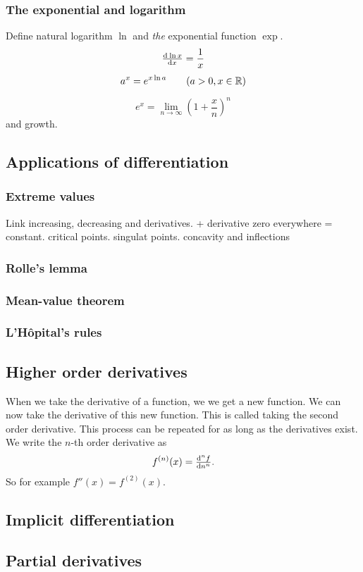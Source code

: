 \subsubsection{The exponential and logarithm}
Define natural logarithm $\ln$ and \textit{the} exponential function $\exp$.
\[ \od{\ln x}{x} = \frac{1}{x} \]
\[ a^x = e^{x\ln a} \qquad (a>0, x\in \mathbb{R}) \]

\[ e^x = \lim_{n\to \infty}\left(1+\frac{x}{n}\right)^n \]
and growth.

\subsection{Applications of differentiation}
\subsubsection{Extreme values}
Link increasing, decreasing and derivatives. + derivative zero everywhere = constant.
critical points. singulat points. concavity and inflections
\subsubsection{Rolle's lemma}
\subsubsection{Mean-value theorem}
\subsubsection{L'Hôpital's rules}


\subsection{Higher order derivatives}
When we take the derivative of a function, we we get a new function. We can now take the derivative of this new function. This is called taking the second order derivative. This process can be repeated for as long as the derivatives exist. We write the $n$-th order derivative as
\[ f^{(n)}(x) = \od[n]{f}{n}. \]
So for example $f''(x) = f^{(2)}(x)$.

\subsection{Implicit differentiation}

\subsection{Partial derivatives}
